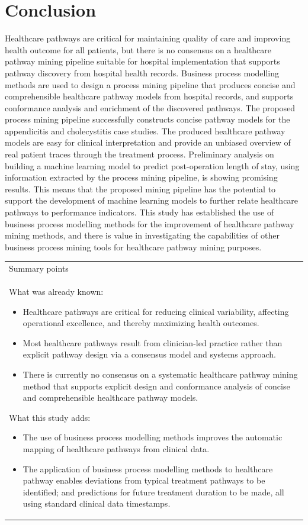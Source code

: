 \documentclass{elsarticle}
\begin{document}
\section{Conclusion}
Healthcare pathways are critical for maintaining quality of care and improving health outcome for all patients, but there is no consensus on a healthcare pathway mining pipeline suitable for hospital implementation that supports pathway discovery from hospital health records. Business process modelling methods are used to design a process mining pipeline that produces concise and comprehensible healthcare pathway models from hospital records, and supports conformance analysis and enrichment of the discovered pathways. The proposed process mining pipeline successfully constructs concise pathway models for the appendicitis and cholecystitis case studies. The produced healthcare pathway models are easy for clinical interpretation and provide an unbiased overview of real patient traces through the treatment process. Preliminary analysis on building a machine learning model to predict post-operation length of stay, using information extracted by the process mining pipeline, is showing promising results. This means that the proposed mining pipeline has the potential to support the development of machine learning models to further relate healthcare pathways to performance indicators. This study has established the use of business process modelling methods for the improvement of healthcare pathway mining methods, and there is value in investigating the capabilities of other business process mining tools for healthcare pathway mining purposes.

\begin{table}[h]
\centering
\begin{tabular}{p{11cm}} 
 Summary points\\ 
 What was already known:
 \begin{itemize}
     \item Healthcare pathways are critical for reducing clinical variability, affecting operational excellence, and thereby maximizing health outcomes.
     \item  Most healthcare pathways result from clinician-led practice rather than explicit pathway design via a consensus model and systems approach. 
     \item  There is currently no consensus on a systematic healthcare pathway mining method that supports explicit design and conformance analysis of concise and comprehensible healthcare pathway models.
 \end{itemize}
 What this study adds:
 \begin{itemize}
     \item  The use of business process modelling methods improves the automatic mapping of healthcare pathways from clinical data.
     \item The application of business process modelling methods to healthcare pathway enables deviations from typical treatment pathways to be identified; and predictions for future treatment duration to be made, all using standard clinical data timestamps. 
 \end{itemize}
\end{tabular}
\end{table}
\end{document}
